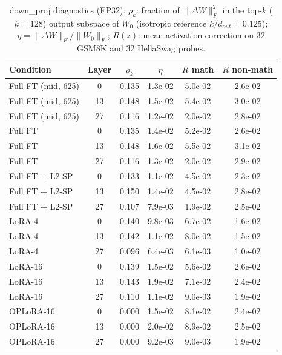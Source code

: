 \begin{table}[t]
\centering
\small
\caption{down\_proj diagnostics (FP32). $\rho_k$: fraction of $\|\Delta W\|_F^2$ in the top-$k$ ($k=128$) output subspace of $W_0$ (isotropic reference $k/d_{out}=0.125$); $\eta=\|\Delta W\|_F/\|W_0\|_F$; $R(z)$: mean activation correction on 32 GSM8K and 32 HellaSwag probes.}
\label{tab:t1_diag}
\begin{tabular}{lccccc}
\toprule
Condition & Layer & $\rho_k$ & $\eta$ & $R$ math & $R$ non-math \\
\midrule
Full FT (mid, 625) & 0 & 0.135 & 1.3e-02 & 5.0e-02 & 2.6e-02 \\
Full FT (mid, 625) & 13 & 0.148 & 1.5e-02 & 5.4e-02 & 3.0e-02 \\
Full FT (mid, 625) & 27 & 0.116 & 1.2e-02 & 2.0e-02 & 2.8e-02 \\
Full FT & 0 & 0.135 & 1.4e-02 & 5.2e-02 & 2.6e-02 \\
Full FT & 13 & 0.148 & 1.6e-02 & 5.5e-02 & 3.1e-02 \\
Full FT & 27 & 0.116 & 1.3e-02 & 2.0e-02 & 2.9e-02 \\
Full FT + L2-SP & 0 & 0.133 & 1.1e-02 & 4.5e-02 & 2.3e-02 \\
Full FT + L2-SP & 13 & 0.150 & 1.4e-02 & 4.5e-02 & 2.8e-02 \\
Full FT + L2-SP & 27 & 0.107 & 7.9e-03 & 1.9e-02 & 2.5e-02 \\
LoRA-4 & 0 & 0.140 & 9.8e-03 & 6.7e-02 & 1.6e-02 \\
LoRA-4 & 13 & 0.142 & 1.1e-02 & 8.0e-02 & 1.5e-02 \\
LoRA-4 & 27 & 0.096 & 6.4e-03 & 6.1e-03 & 1.0e-02 \\
LoRA-16 & 0 & 0.139 & 1.5e-02 & 5.6e-02 & 2.6e-02 \\
LoRA-16 & 13 & 0.143 & 1.9e-02 & 7.1e-02 & 2.4e-02 \\
LoRA-16 & 27 & 0.110 & 1.1e-02 & 9.0e-03 & 1.9e-02 \\
OPLoRA-16 & 0 & 0.000 & 1.5e-02 & 8.1e-02 & 2.4e-02 \\
OPLoRA-16 & 13 & 0.000 & 2.0e-02 & 8.9e-02 & 2.5e-02 \\
OPLoRA-16 & 27 & 0.000 & 9.2e-03 & 9.0e-03 & 1.9e-02 \\
\bottomrule
\end{tabular}
\end{table}
